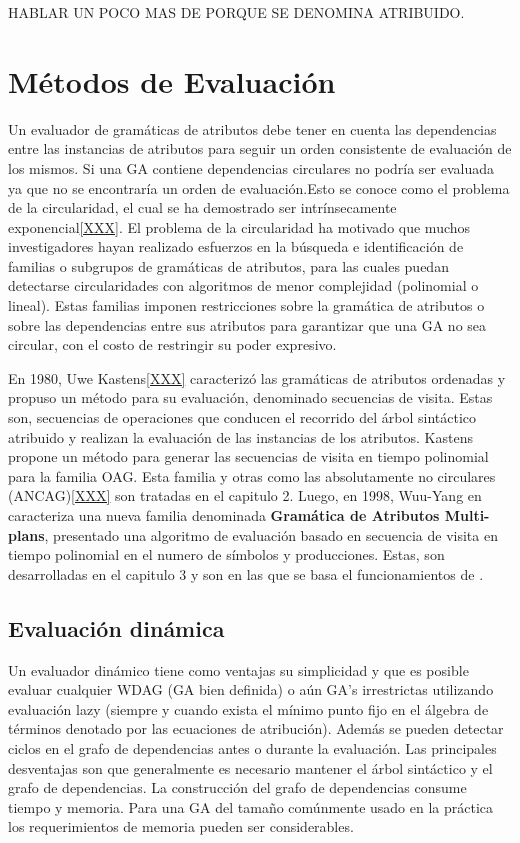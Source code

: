 HABLAR UN POCO MAS DE PORQUE SE DENOMINA ATRIBUIDO.


\section{Métodos de Evaluación}

Un evaluador de gramáticas de atributos debe tener en cuenta las dependencias entre las instancias de atributos para seguir un orden consistente de evaluación de los mismos.
Si una GA contiene dependencias circulares no podría ser evaluada ya que no se encontraría un orden de evaluación.Esto se conoce como el problema de la circularidad, el cual se ha demostrado ser intrínsecamente exponencial\ref{XXX}. El problema de la circularidad ha motivado que muchos investigadores hayan realizado esfuerzos en la búsqueda e identificación de familias o subgrupos de gramáticas de atributos, para las cuales puedan detectarse circularidades con algoritmos de menor complejidad (polinomial o lineal).
Estas familias imponen restricciones sobre la gramática de atributos o sobre las dependencias entre sus atributos para garantizar que una GA no sea circular, con el costo de restringir su poder expresivo.

En 1980, Uwe Kastens\ref{XXX} caracterizó las gramáticas de atributos ordenadas y propuso un método para su evaluación, denominado secuencias de visita. Estas son, secuencias de operaciones que conducen el recorrido del árbol sintáctico atribuido y realizan la evaluación de las instancias de los atributos. Kastens propone un método para generar las secuencias de visita en tiempo polinomial para la familia OAG. Esta familia y otras como las absolutamente no circulares (ANCAG)\ref{XXX} son tratadas en el capitulo 2.
Luego, en 1998, Wuu-Yang en \cite{wuu-yang1} caracteriza una nueva familia denominada \textbf{Gramática de Atributos Multi-plans}, presentado una algoritmo de evaluación basado en secuencia de visita en tiempo polinomial en el numero de símbolos y producciones. Estas, son desarrolladas en el capitulo 3 y son en las que se basa el funcionamientos de \maggen.  

\subsection{Evaluación dinámica}

Un evaluador dinámico tiene como ventajas su simplicidad y que es posible evaluar cualquier WDAG (GA bien definida) o aún GA’s irrestrictas utilizando evaluación lazy (siempre y cuando exista el mínimo punto fijo en el álgebra de términos denotado por las ecuaciones de atribución). Además se pueden detectar ciclos en el grafo de dependencias antes o durante la evaluación.
Las principales desventajas son que generalmente es necesario mantener el árbol sintáctico y el grafo de dependencias. La construcción del grafo de dependencias consume tiempo y memoria. Para una GA del tamaño comúnmente usado en la práctica los requerimientos de memoria pueden ser considerables.

